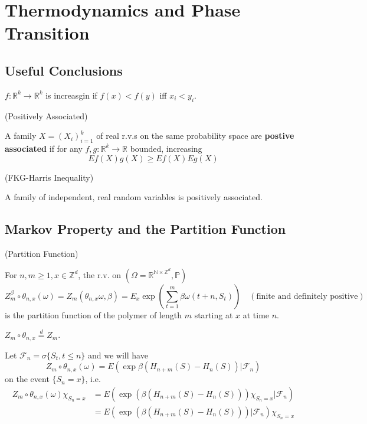 \section{Thermodynamics and Phase Transition}

\subsection{Useful Conclusions}

\begin{definition}
    $f:\mathbb{R}^k \to \mathbb{R}^k$ is increasgin if $f(x) < f(y)$ iff $x_i < y_i$. 
\end{definition}

\begin{definition}
    (Positively Associated)\par
    A family $X = (X_i)_{i=1}^k$ of real r.v.s on the same probability space are \textbf{postive associated} if for any $f,g:\mathbb{R}^k \to \mathbb{R}$ bounded, increasing
    \[
    Ef(X)g(X) \geq Ef(X) Eg(X)
    \]
\end{definition}

\begin{proposition}
    (FKG-Harris Inequality)\par
    A family of independent, real random variables is positively associated.
\end{proposition}
\subsection{Markov Property and the Partition Function}

\begin{definition}(Partition Function)\par
For $n,m\geq 1, x\in \mathbb{Z}^d$, the r.v. on $(\Omega = \mathbb{R}^{\mathbb{N}\times \mathbb{Z}^d}, \mathbb{P})$
\[
Z_m^{\beta} \circ \theta_{n,x}(\omega) = Z_m(\theta_{n,x}\omega, \beta) = E_x\exp{\left(\sum\limits_{t=1}^m \beta \omega(t+n, S_t)\right)}\quad(\text{finite and definitely positive})\]
is the partition function of the polymer of length $m$ starting at $x$ at time $n$.
\end{definition}

\begin{proposition}
    $Z_m\circ \theta_{n,x} \overset{d}{=} Z_m$.
\end{proposition}

\begin{proposition}
    Let $\mathcal{F}_n = \sigma\{S_t, t \leq n\}$ and we will have
    \[
    Z_m \circ \theta_{n,x}(\omega) = E(\exp{\beta(H_{n+m}(S)- H_n(S))}| \mathcal{F}_n)
    \]
    on the event $\{S_n = x\}$, i.e.
    \[
    \begin{aligned}
        Z_m\circ \theta_{n,x}(\omega)\chi_{S_n = x} &= E(\exp{\left(\beta(H_{n+m}(S)- H_n(S))\right)}\chi_{S_n = x}| \mathcal{F}_n)\\ &= E(\exp{\left(\beta(H_{n+m}(S)- H_n(S))\right)}| \mathcal{F}_n)\chi_{S_n = x}
    \end{aligned}
    \]
\end{proposition}

